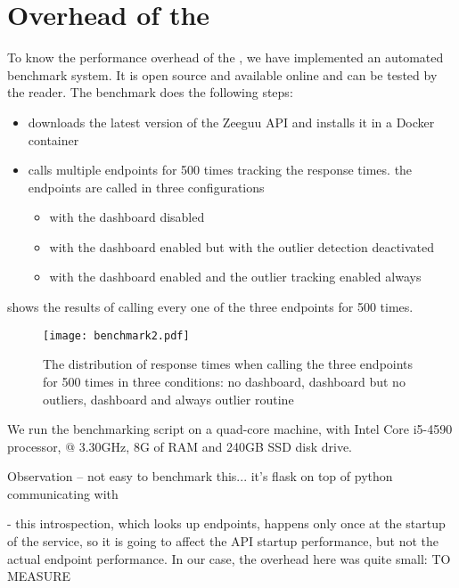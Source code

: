   
\newpage
\section{Overhead of the \tool}
\label{sec:overhead}

To know the performance overhead of the \tool, we have implemented an automated benchmark system. It is open source and available online and can be tested by the reader. The benchmark does the following steps: 

\begin{itemize}
	\item downloads the latest version of the Zeeguu API and installs it in a Docker container
	\item calls multiple endpoints for 500 times tracking the response times. the endpoints are called in three configurations
	\begin{itemize}
		\item with the dashboard disabled
		\item with the dashboard enabled but with the outlier detection deactivated
		\item with the dashboard enabled and the outlier tracking enabled always
	\end{itemize}
\end{itemize}

 shows the results of calling every one of the three endpoints for 500 times. 


\begin{figure}[h!]
	\centering
	\texttt{[image: benchmark2.pdf]}
	\caption{The distribution of response times when calling the three endpoints for 500 times in three conditions: no dashboard, dashboard but no outliers, dashboard and always outlier routine}
	\label{fig:bench}
\end{figure}

We run the benchmarking script on a quad-core machine, with Intel Core i5-4590 processor, @ 3.30GHz, 8G of RAM and 240GB SSD disk drive.



Observation -- not easy to benchmark this... it's flask on top of python communicating with 

- this introspection, which looks up endpoints, happens only once at the startup of the service, so it is going to affect the API startup performance, but not the actual endpoint performance. In our case, the overhead here was quite small: TO MEASURE


  